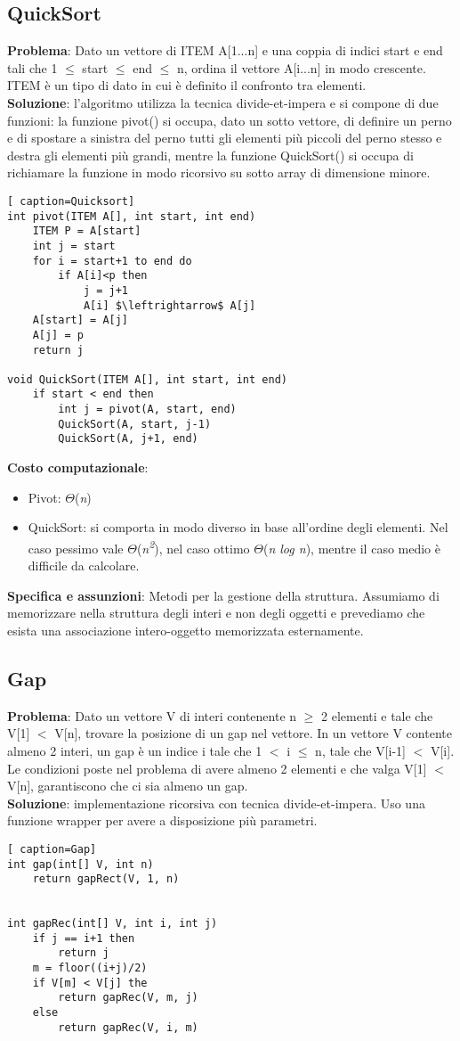 \documentclass[../cheatSheetAlgoritmi.tex]{subfiles}
\begin{document}
\subsection{QuickSort}
\textbf{Problema}: Dato un vettore di ITEM A[1...n] e una coppia di indici start e end tali che 1  $\leq$ start  $\leq$ end  $\leq$ n, ordina il vettore A[i...n] in modo crescente. ITEM è un tipo di dato in cui è definito il confronto tra elementi.\\
\textbf{Soluzione}: l'algoritmo utilizza la tecnica divide-et-impera e si compone di due funzioni: la funzione pivot() si occupa, dato un sotto vettore, di definire un perno e di spostare a sinistra del perno tutti gli elementi più piccoli del perno stesso e  destra  gli elementi più grandi, mentre la funzione QuickSort() si occupa di richiamare la funzione in modo ricorsivo su sotto array di dimensione minore.\
\begin{lstlisting}[ caption=Quicksort]
int pivot(ITEM A[], int start, int end)
	ITEM P = A[start]
	int j = start
	for i = start+1 to end do
		if A[i]<p then 
			j = j+1
			A[i] $\leftrightarrow$ A[j]
	A[start] = A[j]
	A[j] = p	
	return j

void QuickSort(ITEM A[], int start, int end)
	if start < end then
		int j = pivot(A, start, end)
		QuickSort(A, start, j-1)
		QuickSort(A, j+1, end)		
\end{lstlisting}
\textbf{Costo computazionale}:
\begin{itemize}
 	\item Pivot: $\Theta$(\textit{n}) 
 	\item QuickSort: si comporta in modo diverso in base all'ordine degli elementi. Nel caso pessimo vale $\Theta$(\textit{n\textsuperscript{2}}), nel caso ottimo  $\Theta$(\textit{n log n}), mentre il caso medio è difficile da calcolare. 
\end{itemize}
\textbf{Specifica e assunzioni}: Metodi per la gestione della struttura. Assumiamo di memorizzare nella struttura degli interi e non degli oggetti e prevediamo che esista una associazione intero-oggetto memorizzata esternamente.\


\subsection{Gap}
\textbf{Problema}: Dato un vettore V di interi contenente n $\geq$ 2 elementi e tale che V[1] $<$ V[n], trovare la posizione di un gap nel vettore. In un vettore V contente almeno 2 interi, un gap è un indice i tale che 1 $<$ i $\leq$ n, tale che V[i-1] $<$ V[i]. Le condizioni poste nel problema di avere almeno 2 elementi e che valga V[1] $<$ V[n], garantiscono che ci sia almeno un gap.\\
\textbf{Soluzione}: implementazione ricorsiva con tecnica divide-et-impera. Uso una funzione wrapper per avere a disposizione più parametri.
\newpage
\begin{lstlisting}[ caption=Gap]
int gap(int[] V, int n)
	return gapRect(V, 1, n)
	

int gapRec(int[] V, int i, int j)
	if j == i+1 then
		return j
	m = floor((i+j)/2)
	if V[m] < V[j] the
		return gapRec(V, m, j)
	else 
		return gapRec(V, i, m)
\end{lstlisting}\
\end{document}
